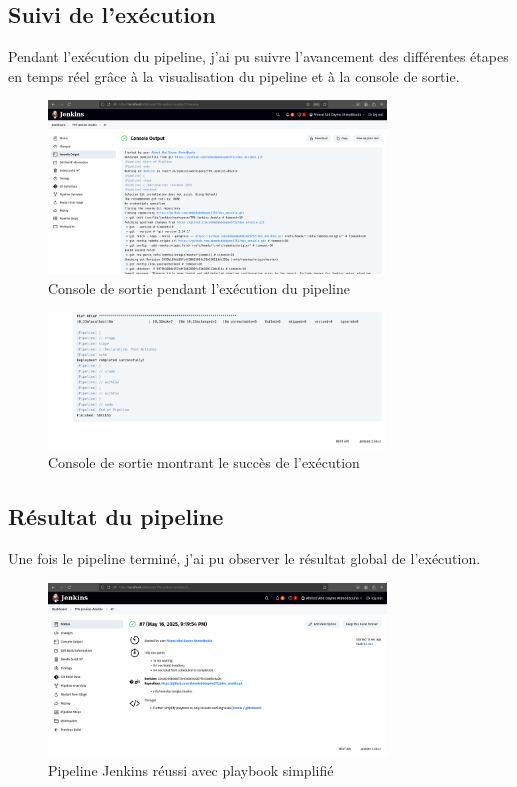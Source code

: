 \documentclass{article}
\begin{document}
\subsection{Suivi de l'exécution}

Pendant l'exécution du pipeline, j'ai pu suivre l'avancement des différentes étapes en temps réel grâce à la visualisation du pipeline et à la console de sortie.

\begin{figure}[h]
    \centering
    \includegraphics[width=0.8\textwidth]{images/jenkins_console_output.png}
    \caption{Console de sortie pendant l'exécution du pipeline}
    \label{fig:jenkins_console_output}
\end{figure}

\begin{figure}[h]
    \centering
    \includegraphics[width=0.8\textwidth]{images/jenkins_console_output_succes.png}
    \caption{Console de sortie montrant le succès de l'exécution}
    \label{fig:jenkins_console_output_succes}
\end{figure}

\subsection{Résultat du pipeline}

Une fois le pipeline terminé, j'ai pu observer le résultat global de l'exécution.

\begin{figure}[h]
    \centering
    \includegraphics[width=0.8\textwidth]{images/jenkins_pipeline_simple.png}
    \caption{Pipeline Jenkins réussi avec playbook simplifié}
    \label{fig:jenkins_pipeline_simple}
\end{figure}
\end{document}
